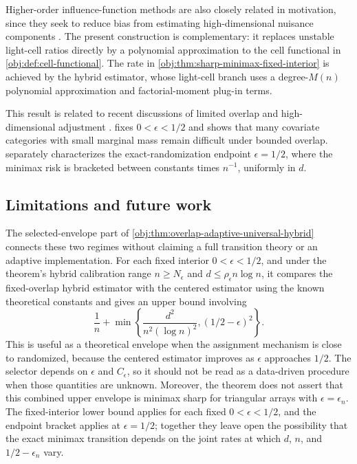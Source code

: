 Higher-order influence-function methods are also closely related in motivation, since they seek to reduce bias from estimating high-dimensional nuisance components \citep{Robins2008,Robins2009,Robins2017,LiuMukherjeeNeweyRobins2017,Kennedy2024}. The present construction is complementary: it replaces unstable light-cell ratios directly by a polynomial approximation to the cell functional in \cref{obj:def:cell-functional}. The rate in \cref{obj:thm:sharp-minimax-fixed-interior} is achieved by the hybrid estimator, whose light-cell branch uses a degree-\(M(n)\) polynomial approximation and factorial-moment plug-in terms.

This result is related to recent discussions of limited overlap and high-dimensional adjustment \citep{DAmour2021,Balakrishnan2023,JinSyrgkanis2025}.  fixes \(0<\epsilon<1/2\) and shows that many covariate categories with small marginal mass remain difficult under bounded overlap.  separately characterizes the exact-randomization endpoint \(\epsilon=1/2\), where the minimax risk is bracketed between constants times \(n^{-1}\), uniformly in \(d\).

\subsection{Limitations and future work}

The selected-envelope part of \cref{obj:thm:overlap-adaptive-universal-hybrid} connects these two regimes without claiming a full transition theory or an adaptive implementation. For each fixed interior \(0<\epsilon<1/2\), and under the theorem's hybrid calibration range \(n\ge N_\epsilon\) and \(d\le \rho_\epsilon n\log n\), it compares the fixed-overlap hybrid estimator with the centered estimator using the known theoretical constants and gives an upper bound involving
\[
\frac1n+
\min\left\{
\frac{d^2}{n^2(\log n)^2},(1/2-\epsilon)^2
\right\}.
\]
This is useful as a theoretical envelope when the assignment mechanism is close to randomized, because the centered estimator improves as \(\epsilon\) approaches \(1/2\). The selector depends on \(\epsilon\) and \(C_\epsilon\), so it should not be read as a data-driven procedure when those quantities are unknown. Moreover, the theorem does not assert that this combined upper envelope is minimax sharp for triangular arrays with \(\epsilon=\epsilon_n\). The fixed-interior lower bound applies for each fixed \(0<\epsilon<1/2\), and the endpoint bracket applies at \(\epsilon=1/2\); together they leave open the possibility that the exact minimax transition depends on the joint rates at which \(d\), \(n\), and \(1/2-\epsilon_n\) vary.
